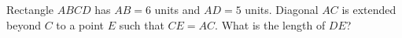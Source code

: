 Rectangle $ABCD$ has $AB=6$ units and $AD=5$ units. Diagonal $AC$ is extended beyond $C$ to a point $E$ such that $CE=AC$. What is the length of $DE$?
